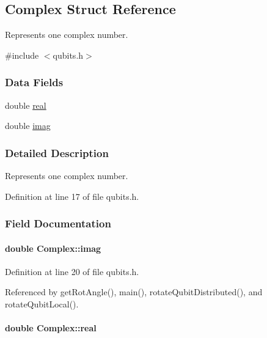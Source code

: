 \hypertarget{structComplex}{}\subsection{Complex Struct Reference}
\label{structComplex}


Represents one complex number.  




{\ttfamily \#include $<$qubits.\+h$>$}

\subsubsection*{Data Fields}
\begin{DoxyCompactItemize}
\item 
double \hyperlink{structComplex_a0138f5fe2b2c6180b8fcda77a7aa51c5}{real}
\item 
double \hyperlink{structComplex_a2bb90cc563599c3c8bdec9acf9ea40a6}{imag}
\end{DoxyCompactItemize}


\subsubsection{Detailed Description}
Represents one complex number. 

Definition at line 17 of file qubits.\+h.



\subsubsection{Field Documentation}
\paragraph[{\texorpdfstring{imag}{imag}}]{\setlength{\rightskip}{0pt plus 5cm}double Complex\+::imag}\hypertarget{structComplex_a2bb90cc563599c3c8bdec9acf9ea40a6}{}\label{structComplex_a2bb90cc563599c3c8bdec9acf9ea40a6}


Definition at line 20 of file qubits.\+h.



Referenced by get\+Rot\+Angle(), main(), rotate\+Qubit\+Distributed(), and rotate\+Qubit\+Local().

\paragraph[{\texorpdfstring{real}{real}}]{\setlength{\rightskip}{0pt plus 5cm}double Complex\+::real}\hypertarget{structComplex_a0138f5fe2b2c6180b8fcda77a7aa51c5}{}\label{structComplex_a0138f5fe2b2c6180b8fcda77a7aa51c5}


